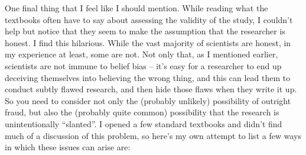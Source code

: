 \documentclass[]{book}
\begin{document}
One final thing that I feel like I should mention. While reading what the textbooks often have to say about assessing the validity of the study, I couldn't help but notice that they seem to make the assumption that the researcher is honest. I find this hilarious. While the vast majority of scientists are honest, in my experience at least, some are not. Not only that, as I mentioned earlier, scientists are not immune to belief bias -- it's easy for a researcher to end up deceiving themselves into believing the wrong thing, and this can lead them to conduct subtly flawed research, and then hide those flaws when they write it up. So you need to consider not only the (probably unlikely) possibility of outright fraud, but also the (probably quite common) possibility that the research is unintentionally ``slanted''. I opened a few standard textbooks and didn't find much of a discussion of this problem, so here's my own attempt to list a few ways in which these issues can arise are:
\end{document}

